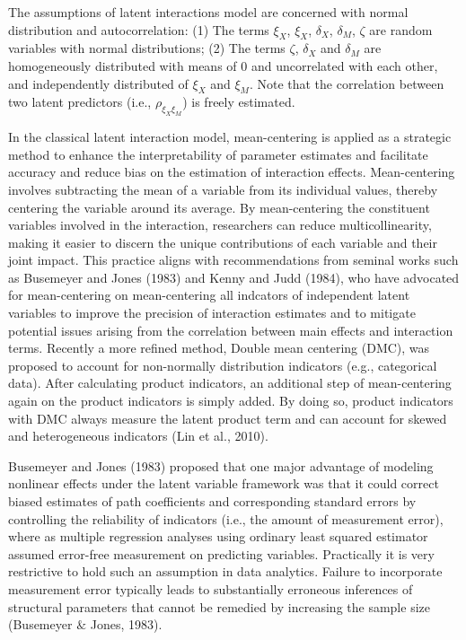 \documentclass[
  man]{apa7}
\begin{document}
The assumptions of latent interactions model are concerned with normal distribution and autocorrelation: (1) The terms \(\xi_{X}\), \(\xi_{X}\), \(\delta_{X}\), \(\delta_{M}\), \(\zeta\) are random variables with normal distributions; (2) The terms \(\zeta\), \(\delta_{X}\) and \(\delta_{M}\) are homogeneously distributed with means of 0 and uncorrelated with each other, and independently distributed of \(\xi_{X}\) and \(\xi_{M}\). Note that the correlation between two latent predictors (i.e., \(\rho_{\xi_{X}\xi_{M}}\)) is freely estimated.

In the classical latent interaction model, mean-centering is applied as a strategic method to enhance the interpretability of parameter estimates and facilitate accuracy and reduce bias on the estimation of interaction effects. Mean-centering involves subtracting the mean of a variable from its individual values, thereby centering the variable around its average. By mean-centering the constituent variables involved in the interaction, researchers can reduce multicollinearity, making it easier to discern the unique contributions of each variable and their joint impact. This practice aligns with recommendations from seminal works such as Busemeyer and Jones (1983) and Kenny and Judd (1984), who have advocated for mean-centering on mean-centering all indcators of independent latent variables to improve the precision of interaction estimates and to mitigate potential issues arising from the correlation between main effects and interaction terms. Recently a more refined method, Double mean centering (DMC), was proposed to account for non-normally distribution indicators (e.g., categorical data).
After calculating product indicators, an additional step of mean-centering again on the product indicators is simply added. By doing so, product indicators with DMC always measure the latent product term and can account for skewed and heterogeneous indicators (Lin et al., 2010).

Busemeyer and Jones (1983) proposed that one major advantage of modeling nonlinear effects under the latent variable framework was that it could correct biased estimates of path coefficients and corresponding standard errors by controlling the reliability of indicators (i.e., the amount of measurement error), where as multiple regression analyses using ordinary least squared estimator assumed error-free measurement on predicting variables. Practically it is very restrictive to hold such an assumption in data analytics. Failure to incorporate measurement error typically leads to substantially erroneous inferences of structural parameters that cannot be remedied by increasing the sample size (Busemeyer \(\&\) Jones, 1983).
\end{document}
